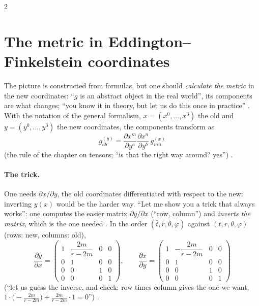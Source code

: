 \begin{paracol}{2}
\section{The metric in Eddington--Finkelstein coordinates}\label{sec:c22-metric}

The picture is constructed from formulas, but one should \emph{calculate the metric} in the new coordinates: ``$g$ is an abstract object in the real world'', its components are what changes; ``you know it in theory, but let us do this once in practice'' . With the notation of the general formalism, $x=(x^0,\dots,x^3)$ the old and $y=(y^0,\dots,y^3)$ the new coordinates, the components transform as
\[
  g^{(y)}_{ab}=\frac{\partial x^m}{\partial y^a}\frac{\partial x^n}{\partial y^b}\,g^{(x)}_{mn}
\]
(the rule of the chapter on tensors; ``is that the right way around? yes'') .

\paragraph{The trick.} One needs $\partial x/\partial y$, the old coordinates differentiated with respect to the new: inverting $y(x)$ would be the harder way. ``Let me show you a trick that always works'': one computes the easier matrix $\partial y/\partial x$ (``row, column'') and \emph{inverts the matrix}, which is the one needed . In the order $(\bar t,\bar r,\bar\theta,\bar\varphi)$ against $(t,r,\theta,\varphi)$ (rows: new, columns: old),
\[
  \frac{\partial y}{\partial x}=\begin{pmatrix}1&\dfrac{2m}{r-2m}&0&0\\0&1&0&0\\0&0&1&0\\0&0&0&1\end{pmatrix},\qquad
  \frac{\partial x}{\partial y}=\begin{pmatrix}1&-\dfrac{2m}{r-2m}&0&0\\0&1&0&0\\0&0&1&0\\0&0&0&1\end{pmatrix}
\]
(``let us guess the inverse, and check: row times column gives the one we want, $1\cdot\bigl(-\tfrac{2m}{r-2m}\bigr)+\tfrac{2m}{r-2m}\cdot1=0$'') .


\end{paracol}
